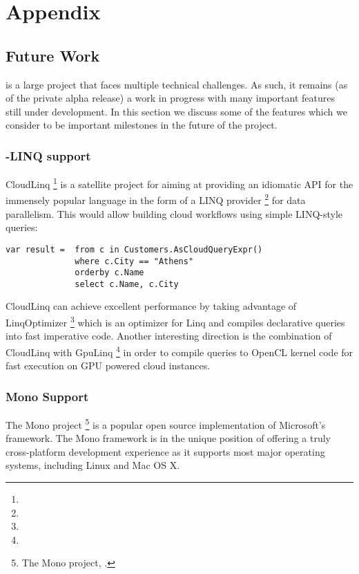 %
%

\section*{Appendix}

\subsection*{Future Work}

\Mbrace{} is a large project that faces multiple technical challenges. As such,
it remains (as of the private alpha release) a work in progress with many important
features still under development. In this section we discuss some of the features
which we consider to be important milestones in the future of the \mbrace{} project.

\subsubsection*{\csharp{}-LINQ support}
CloudLinq%
\footnote{}
is a satellite project for \mbrace{} aiming at providing an idiomatic 
API for the immensely popular \csharp{} language in the
form of a LINQ provider%
\footnote{}
for data parallelism. This would allow building cloud workflows using simple
LINQ-style queries:
\begin{lstlisting}[language=CSharp]
var result =  from c in Customers.AsCloudQueryExpr()
			  where c.City == "Athens"
			  orderby c.Name
			  select c.Name, c.City
\end{lstlisting}
CloudLinq can achieve excellent performance by taking advantage of LinqOptimizer%
\footnote{}
which is an optimizer for Linq and compiles declarative queries into fast imperative code. Another interesting direction is the combination
of CloudLinq with GpuLinq%
\footnote{}
in order to compile queries to OpenCL kernel code for fast execution on GPU powered cloud instances.



\subsubsection*{Mono Support}

The Mono project%
\footnote{The Mono project, .}
is a popular open source implementation of Microsoft's \dotnet{} framework.
The Mono framework is in the unique position of offering a truly cross-platform
\dotnet{} development experience as it supports most major operating systems,
including Linux and Mac OS X.

